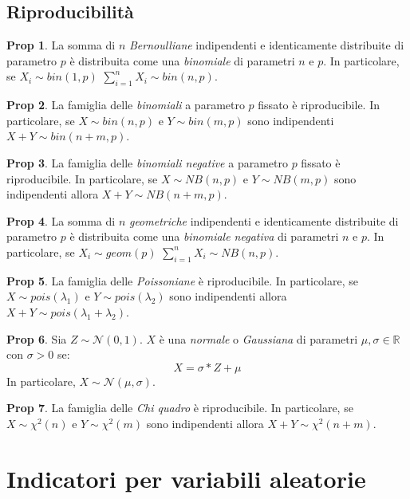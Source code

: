 \documentclass[12pt, a4paper]{report}
\theoremstyle{definition}
\newtheorem*{proposition}{Prop}
\begin{document}
\subsection{Riproducibilità}
\begin{proposition}
    La somma di $n$ \emph{Bernoulliane} indipendenti e identicamente distribuite
    di parametro $p$ è distribuita come una \emph{binomiale} di parametri
    $n$ e $p$. In particolare, se $X_i\sim bin(1,p)$ $\sum_{i=1}^nX_i\sim bin(n,p)$.
\end{proposition}
\begin{proposition}
	La famiglia delle \emph{binomiali} a parametro $p$ fissato è riproducibile.
	In particolare, se $X\sim bin(n,p)$ e $Y\sim bin(m,p)$ sono indipendenti
	$X+Y\sim bin(n+m,p)$.
\end{proposition}
\begin{proposition}
	La famiglia delle \emph{binomiali negative} a parametro $p$ fissato è
	riproducibile. In particolare, se \(X\sim NB(n,p)\) e \(Y\sim NB(m,p)\) sono
    indipendenti allora	\(X+Y\sim NB(n+m,p)\).
\end{proposition}
\begin{proposition}
    La somma di $n$ \emph{geometriche} indipendenti e identicamente distribuite
    di parametro $p$ è distribuita come una \emph{binomiale negativa} di parametri
    $n$ e $p$. In particolare, se $X_i\sim geom(p)$ $\sum_{i=1}^nX_i\sim NB(n,p)$.
\end{proposition}
\begin{proposition}
	La famiglia delle \emph{Poissoniane} è riproducibile. In particolare, se
    \(X\sim pois(\lambda_1)\) e \(Y\sim pois(\lambda_2)\) sono indipendenti allora
	\(X+Y\sim pois(\lambda_1+\lambda_2)\).
\end{proposition}
\begin{proposition}
    Sia $Z\sim\mathcal{N}(0,1)$. $X$ è una \emph{normale} o \emph{Gaussiana} di
	parametri $\mu,\sigma\in\mathbb{R}$ con $\sigma>0$ se:
	\[X=\sigma*Z+\mu\]
	In particolare, $X\sim\mathcal{N}(\mu,\sigma)$.
\end{proposition}
\begin{proposition}
    La famiglia delle \emph{Chi quadro} è riproducibile. In particolare, se
    \(X\sim \chi^2(n)\) e \(Y\sim \chi^2(m)\) sono indipendenti allora
	\(X+Y\sim \chi^2(n+m)\).
\end{proposition}

\section{Indicatori per variabili aleatorie}
\end{document}
